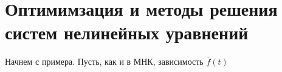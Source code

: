 \section{Оптимимзация и методы решения систем нелинейных уравнений}
Начнем с примера. Пусть, как и в МНК, зависимость $\overline{f}(t)$